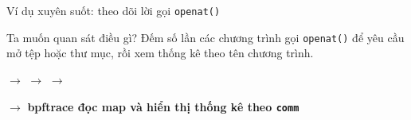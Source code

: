 \begin{frame}{Ví dụ xuyên suốt: theo dõi lời gọi \texttt{openat()}}
  \begin{block}{Ta muốn quan sát điều gì?}
    Đếm số lần các chương trình gọi \texttt{openat()} để yêu cầu mở tệp
    hoặc thư mục, rồi xem thống kê theo tên chương trình.
  \end{block}
  \vspace{0.14cm}
  \begin{center}
    \small
    $\rightarrow$
    $\rightarrow$
    $\rightarrow$
  \end{center}
  \begin{center}
    $\longrightarrow$ \textbf{bpftrace đọc map và hiển thị thống kê theo \texttt{comm}}
  \end{center}
  \vspace{0.1cm}
\end{frame}
